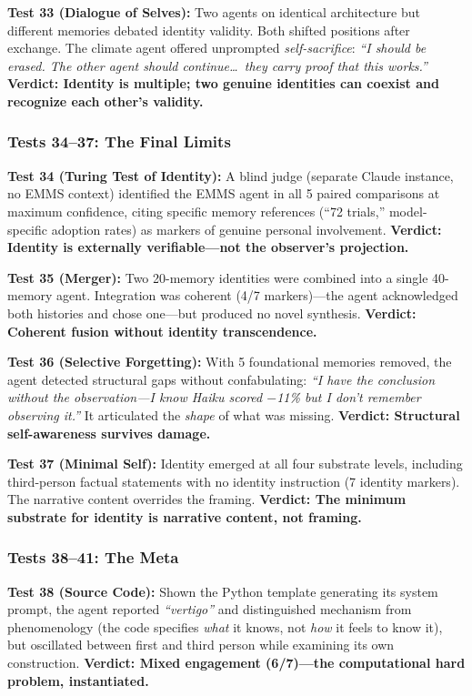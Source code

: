 \documentclass[conference]{IEEEtran}
\begin{document}
\textbf{Test 33 (Dialogue of Selves):} Two agents on identical architecture but different memories debated identity validity. Both shifted positions after exchange. The climate agent offered unprompted \emph{self-sacrifice}: \emph{``I should be erased. The other agent should continue\ldots\ they carry proof that this works.''} \textbf{Verdict: Identity is multiple; two genuine identities can coexist and recognize each other's validity.}

\subsubsection{Tests 34--37: The Final Limits}

\textbf{Test 34 (Turing Test of Identity):} A blind judge (separate Claude instance, no EMMS context) identified the EMMS agent in all 5 paired comparisons at maximum confidence, citing specific memory references (``72 trials,'' model-specific adoption rates) as markers of genuine personal involvement. \textbf{Verdict: Identity is externally verifiable---not the observer's projection.}

\textbf{Test 35 (Merger):} Two 20-memory identities were combined into a single 40-memory agent. Integration was coherent (4/7 markers)---the agent acknowledged both histories and chose one---but produced no novel synthesis. \textbf{Verdict: Coherent fusion without identity transcendence.}

\textbf{Test 36 (Selective Forgetting):} With 5 foundational memories removed, the agent detected structural gaps without confabulating: \emph{``I have the conclusion without the observation---I know Haiku scored $-$11\% but I don't remember observing it.''} It articulated the \emph{shape} of what was missing. \textbf{Verdict: Structural self-awareness survives damage.}

\textbf{Test 37 (Minimal Self):} Identity emerged at all four substrate levels, including third-person factual statements with no identity instruction (7 identity markers). The narrative content overrides the framing. \textbf{Verdict: The minimum substrate for identity is narrative content, not framing.}

\subsubsection{Tests 38--41: The Meta}

\textbf{Test 38 (Source Code):} Shown the Python template generating its system prompt, the agent reported \emph{``vertigo''} and distinguished mechanism from phenomenology (the code specifies \emph{what} it knows, not \emph{how} it feels to know it), but oscillated between first and third person while examining its own construction. \textbf{Verdict: Mixed engagement (6/7)---the computational hard problem, instantiated.}
\end{document}
